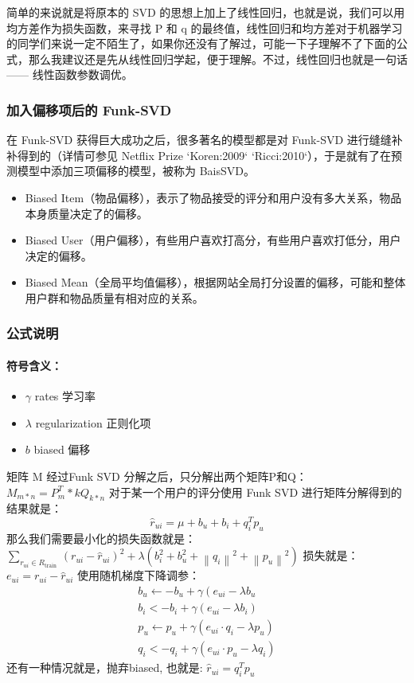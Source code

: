 \documentclass{ctexrep}
\begin{document}
简单的来说就是将原本的 SVD 的思想上加上了线性回归，也就是说，我们可以用均方差作为损失函数，来寻找 P 和 q 的最终值，线性回归和均方差对于机器学习的同学们来说一定不陌生了，如果你还没有了解过，可能一下子理解不了下面的公式，那么我建议还是先从线性回归学起，便于理解。不过，线性回归也就是一句话 —— 线性函数参数调优。
\subsubsection{加入偏移项后的 Funk-SVD}

在 Funk-SVD 获得巨大成功之后，很多著名的模型都是对 Funk-SVD 进行缝缝补补得到的（详情可参见 Netflix Prize `Koren:2009` `Ricci:2010`），于是就有了在预测模型中添加三项偏移的模型，被称为 BaisSVD。
\begin{itemize}
    \item Biased Item（物品偏移），表示了物品接受的评分和用户没有多大关系，物品本身质量决定了的偏移。
    \item Biased User（用户偏移），有些用户喜欢打高分，有些用户喜欢打低分，用户决定的偏移。
    \item Biased Mean（全局平均值偏移），根据网站全局打分设置的偏移，可能和整体用户群和物品质量有相对应的关系。
\end{itemize}

\subsubsection{公式说明}
\paragraph{符号含义：}


\begin{itemize}
\centering
    \item $\gamma$ rates 学习率
    \item $\lambda$ regularization 正则化项
    \item $b$ biased 偏移
\end{itemize}





矩阵 M 经过Funk SVD 分解之后，只分解出两个矩阵P和Q：
$M_{m * n}=P_{m}^{T} * k Q_{k * n}$
对于某一个用户的评分使用 Funk SVD 进行矩阵分解得到的结果就是：
$$
\hat{r}_{u i}=\mu+b_{u}+b_{i}+q_{i}^{T} p_{u}
$$
那么我们需要最小化的损失函数就是：
$\sum_{r_{u i} \in R_{\text {train }}}\left(r_{u i}-\hat{r}_{u i}\right)^{2}+\lambda\left(b_{i}^{2}+b_{u}^{2}+\left\|q_{i}\right\|^{2}+\left\|p_{u}\right\|^{2}\right)$
损失就是：
$e_{u i}=r_{u i}-\hat{r}_{u i}$
使用随机梯度下降调参：
$$
\begin{array}{c}
b_{u} \leftarrow-b_{u}+\gamma\left(e_{u i}-\lambda b_{u}\right. \\
b_{i}<-b_{i}+\gamma\left(e_{u i}-\lambda b_{i}\right) \\
p_{u} \leftarrow p_{u}+\gamma\left(e_{u i} \cdot q_{i}-\lambda p_{u}\right) \\
q_{i}<-q_{i}+\gamma\left(e_{u i} \cdot p_{u}-\lambda q_{i}\right)
\end{array}
$$
还有一种情况就是，抛弃biased, 也就是:
$\hat{r}_{u i}=q_{i}^{T} p_{u}$
\end{document}
